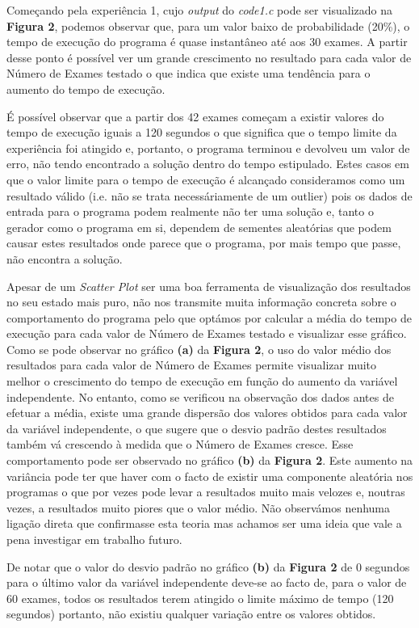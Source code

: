 \documentclass{article}
\begin{document}
Começando pela experiência 1, cujo \textit{output} do \textit{code1.c} pode ser visualizado na \textbf{Figura 2}, podemos observar que, para um valor baixo de probabilidade (20\%), o tempo de execução do programa é quase instantâneo até aos 30 exames. A partir desse ponto é possível ver um grande crescimento no resultado para cada valor de Número de Exames testado o que indica que existe uma tendência para o aumento do tempo de execução.\par

É possível observar que a partir dos 42 exames começam a existir valores do tempo de execução iguais a 120 segundos o que significa que o tempo limite da experiência foi atingido e, portanto, o programa terminou e devolveu um valor de erro, não tendo encontrado a solução dentro do tempo estipulado. Estes casos em que o valor limite para o tempo de execução é alcançado consideramos como um resultado válido (i.e. não se trata necessáriamente de um outlier) pois os dados de entrada para o programa podem realmente não ter uma solução e, tanto o gerador como o programa em si, dependem de sementes aleatórias que podem causar estes resultados onde parece que o programa, por mais tempo que passe, não encontra a solução.\par

Apesar de um \textit{Scatter Plot} ser uma boa ferramenta de visualização dos resultados no seu estado mais puro, não nos transmite muita informação concreta sobre o comportamento do programa pelo que optámos por calcular a média do tempo de execução para cada valor de Número de Exames testado e visualizar esse gráfico. Como se pode observar no gráfico \textbf{(a)} da \textbf{Figura 2}, o uso do valor médio dos resultados para cada valor de Número de Exames permite visualizar muito melhor o crescimento do tempo de execução em função do aumento da variável independente. No entanto, como se verificou na observação dos dados antes de efetuar a média, existe uma grande dispersão dos valores obtidos para cada valor da variável independente, o que sugere que o desvio padrão destes resultados também vá crescendo à medida que o Número de Exames cresce. Esse comportamento pode ser observado no gráfico \textbf{(b)} da \textbf{Figura 2}. Este aumento na variância pode ter que haver com o facto de existir uma componente aleatória nos programas o que por vezes pode levar a resultados muito mais velozes e, noutras vezes, a resultados muito piores que o valor médio. Não observámos nenhuma ligação direta que confirmasse esta teoria mas achamos ser uma ideia que vale a pena investigar em trabalho futuro.\par
De notar que o valor do desvio padrão no gráfico \textbf{(b)} da \textbf{Figura 2} de 0 segundos para o último valor da variável independente deve-se ao facto de, para o valor de 60 exames, todos os resultados terem atingido o limite máximo de tempo (120 segundos) portanto, não existiu qualquer variação entre os valores obtidos.
\end{document}
